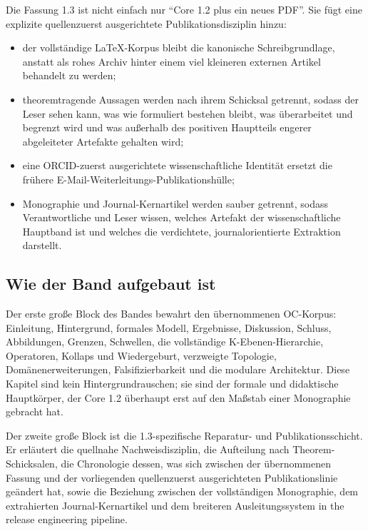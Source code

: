 Die Fassung 1.3 ist nicht einfach nur ``Core 1.2 plus ein neues PDF''.
Sie fügt eine explizite quellenzuerst ausgerichtete Publikationsdisziplin hinzu:

\begin{itemize}
\item der vollständige LaTeX-Korpus bleibt die kanonische Schreibgrundlage, anstatt als
      rohes Archiv hinter einem viel kleineren externen Artikel behandelt zu werden;
\item theoremtragende Aussagen werden nach ihrem Schicksal getrennt, sodass der Leser sehen kann,
      was wie formuliert bestehen bleibt, was überarbeitet und begrenzt wird und was außerhalb des
      positiven Hauptteils engerer abgeleiteter Artefakte gehalten wird;
\item eine ORCID-zuerst ausgerichtete wissenschaftliche Identität ersetzt die frühere
      E-Mail-Weiterleitungs-Publikationshülle;
\item Monographie und Journal-Kernartikel werden sauber getrennt, sodass Verantwortliche und
      Leser wissen, welches Artefakt der wissenschaftliche Hauptband ist und welches die
      verdichtete, journalorientierte Extraktion darstellt.
\end{itemize}

\subsection{Wie der Band aufgebaut ist}

Der erste große Block des Bandes bewahrt den übernommenen OC-Korpus: Einleitung, Hintergrund,
formales Modell, Ergebnisse, Diskussion, Schluss, Abbildungen, Grenzen, Schwellen, die
vollständige K-Ebenen-Hierarchie, Operatoren, Kollaps und Wiedergeburt, verzweigte Topologie,
Domänenerweiterungen, Falsifizierbarkeit und die modulare Architektur. Diese Kapitel sind kein
Hintergrundrauschen; sie sind der formale und didaktische Hauptkörper, der Core 1.2 überhaupt erst
auf den Maßstab einer Monographie gebracht hat.

Der zweite große Block ist die 1.3-spezifische Reparatur- und Publikationsschicht.
Er erläutert die quellnahe Nachweisdisziplin, die Aufteilung nach Theorem-Schicksalen, die
Chronologie dessen, was sich zwischen der übernommenen Fassung und der vorliegenden
quellenzuerst ausgerichteten Publikationslinie geändert hat, sowie die Beziehung zwischen der
vollständigen Monographie, dem extrahierten Journal-Kernartikel und dem breiteren
Ausleitungssystem in the release engineering pipeline.

